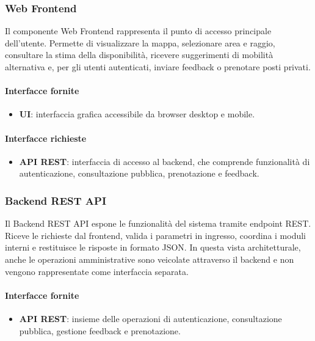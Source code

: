 \documentclass[12pt,a4paper]{article}
\begin{document}
\subsubsection{Web Frontend}
Il componente Web Frontend rappresenta il punto di accesso principale dell’utente. Permette di visualizzare la mappa, selezionare area e raggio, consultare la stima della disponibilità, ricevere suggerimenti di mobilità alternativa e, per gli utenti autenticati, inviare feedback o prenotare posti privati.

\paragraph{Interfacce fornite}
\begin{itemize}
    \item \textbf{UI}: interfaccia grafica accessibile da browser desktop e mobile.
\end{itemize}

\paragraph{Interfacce richieste}
\begin{itemize}
    \item \textbf{API REST}: interfaccia di accesso al backend, che comprende funzionalità di autenticazione, consultazione pubblica, prenotazione e feedback.
\end{itemize}

\subsubsection{Backend REST API}
Il Backend REST API espone le funzionalità del sistema tramite endpoint REST. Riceve le richieste dal frontend, valida i parametri in ingresso, coordina i moduli interni e restituisce le risposte in formato JSON. In questa vista architetturale, anche le operazioni amministrative sono veicolate attraverso il backend e non vengono rappresentate come interfaccia separata.

\paragraph{Interfacce fornite}
\begin{itemize}
    \item \textbf{API REST}: insieme delle operazioni di autenticazione, consultazione pubblica, gestione feedback e prenotazione.
\end{itemize}
\end{document}
